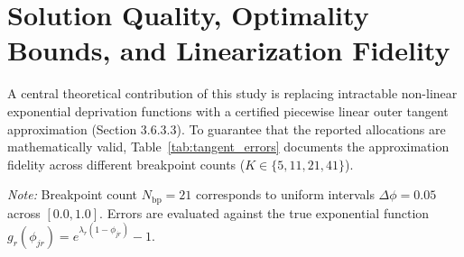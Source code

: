 \section{Solution Quality, Optimality Bounds, and Linearization Fidelity}
\label{sec:solution_quality}

A central theoretical contribution of this study is replacing intractable non-linear exponential deprivation functions with a certified piecewise linear outer tangent approximation (Section 3.6.3.3). To guarantee that the reported allocations are mathematically valid, Table~\ref{tab:tangent_errors} documents the approximation fidelity across different breakpoint counts ($K \in \{5, 11, 21, 41\}$).

\begin{table}[htbp]
\centering
\caption{Piecewise Linear Epigraph Approximation Errors Across Breakpoint Discretizations}
\label{tab:tangent_errors}
\vspace{1ex}
\parbox{\textwidth}{\footnotesize \textit{Note:} Breakpoint count $N_{\text{bp}} = 21$ corresponds to uniform intervals $\Delta \phi = 0.05$ across $[0.0, 1.0]$. Errors are evaluated against the true exponential function $g_r(\phi_{jr}) = e^{\lambda_r(1-\phi_{jr})} - 1$.}
\end{table}

